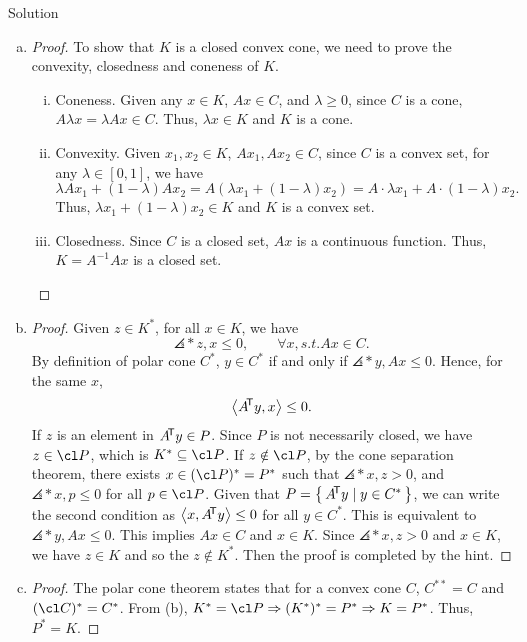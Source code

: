 \documentclass{article}
\begin{document}
\begin{solution}
    {Solution}
    \begin{enumerate}[(a)]
        \item {
            \begin{proof}
                To show that $K$ is a closed convex cone, we need to prove the convexity, closedness and coneness of $K$.
                \begin{enumerate}[(i)]
                    \item Coneness. Given any $x\in K$, $Ax\in C$, and $\lambda\geq0$, since $C$ is a cone, $A\lambda x=\lambda Ax\in C$. Thus, $\lambda x\in K$ and $K$ is a cone.
                    \item Convexity. Given $x_1, x_2 \in K$, $Ax_1, Ax_2 \in C$, since $C$ is a convex set, for any $\lambda\in[0, 1]$, we have \[\lambda Ax_1+(1-\lambda)Ax_2=A(\lambda x_1+(1-\lambda)x_2)=A\cdot\lambda x_1+A\cdot(1-\lambda)x_2.\] Thus, $\lambda x_1+(1-\lambda)x_2\in K$ and $K$ is a convex set.
                    \item Closedness. Since $C$ is a closed set, $Ax$ is a continuous function. Thus, $K=A^{-1}Ax$ is a closed set.
                \end{enumerate}
            \end{proof}
        }
        \item {
            \begin{proof}
                Given $z\in K^*$, for all $x\in K$, we have \[\angles*{z,x}\leq 0, \qquad \forall x, s.t. Ax\in C.\] By definition of polar cone $C^*$, $y\in C^*$ if and only if $\angles*{y, Ax}\leq 0$. Hence, for the same $x$, \[\angles*{A\trn y, x}\leq 0.\] If $z$ is an element in $A\trn y\in P$. Since $P$ is not necessarily closed, we have $z\in \cl P$, which is $K^*\subseteq \cl P$. If $z\notin \cl P$, by the cone separation theorem, there exists $x\in (\cl P)^*=P^*$ such that $\angles*{x, z}>0$, and $\angles*{x, p}\leq 0$ for all $p\in \cl P$. Given that $P=\set{A\trn y \mid y\in C^*}$, we can write the second condition as $\angles*{x, A\trn y} \leq 0$ for all $y\in C^*$. This is equivalent to $\angles*{y, Ax}\leq 0$. This implies $Ax\in C$ and $x\in K$. Since $\angles*{x, z}>0$ and $x\in K$, we have $z\in K$ and so the $z\notin K^*$. Then the proof is completed by the hint.
            \end{proof}
        }
        \item {
            \begin{proof}
                The polar cone theorem states that for a convex cone $C$, $C^{**}=C$ and $(\cl C)^*=C^*$. From (b), $K^*=\cl P\Rightarrow (K^*)^*=P^*\Rightarrow K=P^*$. Thus, $P^*=K$.
            \end{proof}
        }
    \end{enumerate}
\end{solution}
\end{document}
